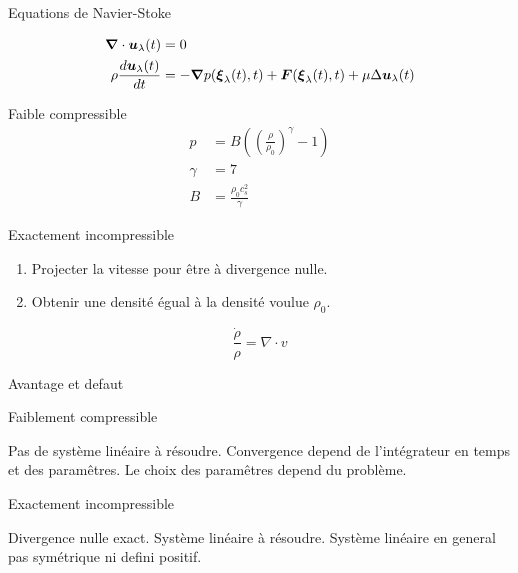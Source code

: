 \begin{frame}{Equations de Navier-Stoke}
 
\begin{align*}
{\boldsymbol {\nabla}} \cdot {\boldsymbol {u}}_{\lambda}(t)&=0\\
\rho\frac{d {\boldsymbol {u}}_{\lambda}(t)}{d t}&=-{\boldsymbol {\nabla}} p({\boldsymbol {\xi}}_{\lambda}(t),t)+{\boldsymbol {F}}({\boldsymbol {\xi}}_{\lambda}(t),t)+\mu \Delta {\boldsymbol {u}}_{\lambda}(t)
\end{align*}

\begin{block}{Faible compressible}
\begin{align*}
 p&=B\left(\left(\frac{\rho}{\rho_{0}}\right)^\gamma-1\right)\\
 \gamma&=7\\
 B&=\frac{\rho_0 c_s^2}{\gamma}
 \end{align*}
\end{block}

\begin{block}{Exactement incompressible}
 \begin{enumerate}
  \item Projecter la vitesse pour être à divergence nulle.
  \item Obtenir une densité égual à la densité voulue $\rho_0$.
 \end{enumerate}
\begin{equation*}
 \frac{\dot{\rho}}{\rho}=\nabla \cdot v
\end{equation*}

\end{block}

\end{frame}

\begin{frame}{Avantage et defaut}
 \begin{block}{Faiblement compressible}
  \begin{itemize}
   \plusitem Pas de système linéaire à résoudre.
   \moinsitem Convergence depend de l'intégrateur en temps et des paramêtres.
   \moinsitem Le choix des paramêtres depend du problème.
  \end{itemize}

 \end{block}
 
 \begin{block}{Exactement incompressible}
 \begin{itemize}
  \plusitem Divergence nulle exact.
  \moinsitem Système linéaire à résoudre.
  \moinsitem Système linéaire en general pas symétrique ni defini positif.
 \end{itemize}
  
 \end{block}

\end{frame}


